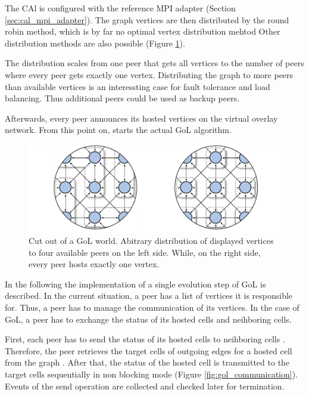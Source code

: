 The CAl is configured with the reference MPI adapter (Section
\ref{sec:cal_mpi_adapter}).  The graph vertices are then distributed
by the round robin method, which is by far no optimal vertex
distribution mehtod Other distribution methods are also possible
(Figure \ref{fig:gol_mapping}).


The distribution scales from one peer that gets all vertices to the
number of peers where every peer gets exactly one vertex. Distributing
the graph to more peers than available vertices is an interessting
case for fault tolerance and load balancing. Thus additional peers
could be used as backup peers. 

Afterwards, every peer announces its hosted vertices on the virtual
overlay network. From this point on, starts the actual GoL algorithm.

\begin{figure}[H]
  \centering
  \includegraphics[width=\textwidth]{graphics/40_gol_mapping}
  \caption{Cut out of a GoL world. Abitrary distribution of
    displayed vertices to four available peers on the left
    side. While, on the right side, every peer hosts exactly one
    vertex.}
  \label{fig:gol_mapping}
\end{figure}

In the following the implementation of a single evolution step of GoL
is described.  In the current situation, a peer has a list of vertices
it is responsible for. Thus, a peer has to manage the communication of
its vertices. In the case of GoL, a peer has to exchange the status of
its hosted cells and neihboring cells.

First, each peer has to send the status of its hosted cells to
neihboring cells . Therefore, the peer retrieves the target cells of
outgoing edges for a hosted cell from the graph . After that, the
status of the hosted cell is transmitted to the target cells
sequentially in non blocking mode (Figure
\ref{fig:gol_communication}). Events of the send operation are
collected and checked later for termination.

